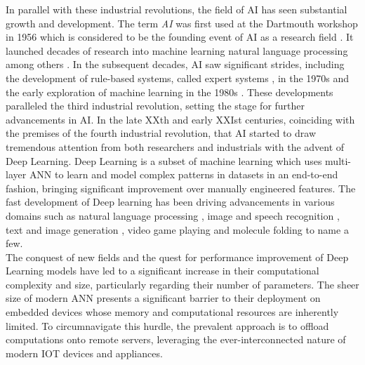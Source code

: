 In parallel with these industrial revolutions, the field of \ac{AI} has seen
substantial growth and development. The term \emph{\acl{AI}} was first used at
the Dartmouth workshop in 1956 which is considered to be the founding event of
\ac{AI} as a research field \cite{dartmouth1956}. It launched decades of
research into machine learning natural language processing among others
\cite{nilsson1998artificial}. In the subsequent decades, \ac{AI} saw significant
strides, including the development of rule-based systems, called expert systems
\cite{giarratano1994expert}, in the 1970s and the early exploration of machine
learning in the 1980s \cite{rumelhart1986learning}. These developments
paralleled the third industrial revolution, setting the stage for further
advancements in \ac{AI}. In the late XXth and early XXIst centuries, coinciding
with the premises of the fourth industrial revolution, that \ac{AI} started to
draw tremendous attention from both researchers and industrials with the advent
of Deep Learning. Deep Learning is a subset of machine learning which uses
multi-layer \ac{ANN} to learn and model complex patterns in datasets in an
end-to-end fashion, bringing significant improvement over manually engineered
features. The fast development of Deep learning has been driving advancements in
various domains such as natural language processing
\cite{DBLP:conf/emnlp/BudzianowskiV19,DBLP:conf/naacl/DevlinCLT19,DBLP:conf/nips/VaswaniSPUJGKP17},
image and speech recognition
\cite{DBLP:conf/nips/KrizhevskySH12,DBLP:journals/corr/SimonyanZ14a,DBLP:conf/cvpr/HeZRS16,DBLP:journals/corr/HannunCCCDEPSSCN14,DBLP:conf/icassp/ChanJLV16,DBLP:conf/icml/AmodeiABCCCCCCD16},
text and image generation
\cite{goodfellow2020generative,karras2019style,DBLP:conf/emnlp/BudzianowskiV19},
video game playing \cite{silver2016mastering,silver2018general} and molecule
folding \cite{jumper2021highly} to name a few.\\


The conquest of new fields and the quest for performance improvement of Deep
Learning models have led to a significant increase in their computational
complexity and size, particularly regarding their number of parameters. The
sheer size of modern \ac{ANN} presents a significant barrier to their deployment
on embedded devices whose memory and computational resources are inherently
limited. To circumnavigate this hurdle, the prevalent approach is to offload
computations onto remote servers, leveraging the ever-interconnected nature of
modern \ac{IOT} devices and appliances.\\

